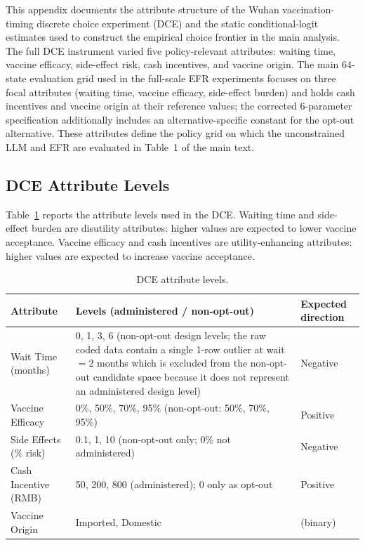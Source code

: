\documentclass[11pt]{article}
\begin{document}
This appendix documents the attribute structure of the Wuhan vaccination-timing discrete choice experiment (DCE) and the static conditional-logit estimates used to construct the empirical choice frontier in the main analysis. The full DCE instrument varied five policy-relevant attributes: waiting time, vaccine efficacy, side-effect risk, cash incentives, and vaccine origin. The main 64-state evaluation grid used in the full-scale EFR experiments focuses on three focal attributes (waiting time, vaccine efficacy, side-effect burden) and holds cash incentives and vaccine origin at their reference values; the corrected 6-parameter specification additionally includes an alternative-specific constant for the opt-out alternative. These attributes define the policy grid on which the unconstrained LLM and EFR are evaluated in Table~1 of the main text.

\subsection{DCE Attribute Levels}

Table~\ref{tab:S3} reports the attribute levels used in the DCE. Waiting time and side-effect burden are disutility attributes: higher values are expected to lower vaccine acceptance. Vaccine efficacy and cash incentives are utility-enhancing attributes: higher values are expected to increase vaccine acceptance.

\begin{table}[htbp]
\centering
\caption{DCE attribute levels.}
\label{tab:S3}
\begin{tabular}{lll}
\hline
Attribute & Levels (administered / non-opt-out) & Expected direction \\
\hline
Wait Time (months) & 0, 1, 3, 6 (non-opt-out design levels; the raw coded data contain a single 1-row outlier at wait $= 2$ months which is excluded from the non-opt-out candidate space because it does not represent an administered design level) & Negative \\
Vaccine Efficacy & 0\%, 50\%, 70\%, 95\% (non-opt-out: 50\%, 70\%, 95\%) & Positive \\
Side Effects (\% risk) & 0.1, 1, 10 (non-opt-out only; 0\% not administered) & Negative \\
Cash Incentive (RMB) & 50, 200, 800 (administered); 0 only as opt-out & Positive \\
Vaccine Origin & Imported, Domestic & (binary) \\
\hline
\end{tabular}
\end{table}
\end{document}
